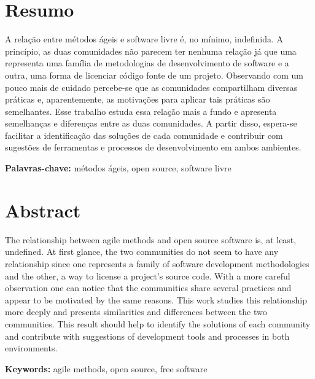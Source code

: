 \documentclass[11pt,twoside,a4paper]{book}
\begin{document}
\chapter*{Resumo}

A relação entre métodos ágeis e software livre é, no mínimo,
indefinida. A princípio, as duas comunidades não parecem ter nenhuma
relação já que uma representa uma família de metodologias de
desenvolvimento de software e a outra, uma forma de licenciar código
fonte de um projeto. Observando com um pouco mais de cuidado
percebe-se que as comunidades compartilham diversas práticas e,
aparentemente, as motivações para aplicar tais práticas são
semelhantes. Esse trabalho estuda essa relação mais a fundo e
apresenta semelhanças e diferenças entre as duas comunidades. A partir
disso, espera-se facilitar a identificação das soluções de cada
comunidade e contribuir com sugestões de ferramentas e processos de
desenvolvimento em ambos ambientes.

\noindent \textbf{Palavras-chave:} métodos ágeis, open source,
software livre

\chapter*{Abstract}

The relationship between agile methods and open source software is, at
least, undefined. At first glance, the two communities do not seem to
have any relationship since one represents a family of software
development methodologies and the other, a way to license a project's
source code. With a more careful observation one can notice that the
communities share several practices and appear to be motivated by the
same reasons. This work studies this relationship more deeply and
presents similarities and differences between the two
communities. This result should help to identify the solutions of
each community and contribute with suggestions of development tools
and processes in both environments.

\noindent \textbf{Keywords:} agile methods, open source, free software

\tableofcontents %

\end{document}
